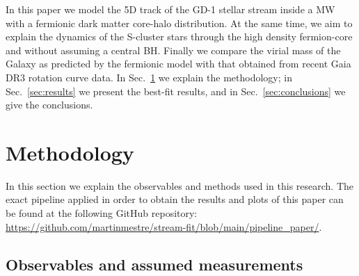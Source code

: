 \documentclass[twocolumn]{aa}
\begin{document}
In this paper we model the 5D track of the GD-1 stellar stream inside a MW with a fermionic dark matter core-halo distribution. At the same time, we aim to explain the dynamics of the S-cluster stars through the high density fermion-core and without assuming a central BH. Finally we compare the virial mass of the Galaxy as predicted by the fermionic model with that obtained from recent Gaia DR3 rotation curve data. In Sec.~\ref{sec:methodology} we explain the methodology; in Sec.~\ref{sec:results} we present the best-fit results, and in Sec.~\ref{sec:conclusions} we give the conclusions.

\section{Methodology}
\label{sec:methodology}
In this section we explain the observables and methods used in this research.
The exact pipeline applied in order to obtain the results and plots of this paper
can be found at the following GitHub repository:
\url{https://github.com/martinmestre/stream-fit/blob/main/pipeline_paper/}.

\subsection{Observables and assumed measurements}
\label{sec:observables}
\end{document}
